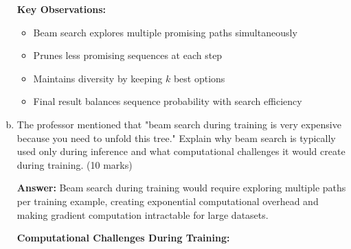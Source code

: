 \documentclass[12pt]{article}
\newcommand{\answer}[1]{{\color{answercolor}\textbf{Answer:} #1}}
\newcommand{\explanation}[1]{{\color{explanationcolor}#1}}
\begin{document}
\begin{enumerate}[(a)]
{\begin{center}
    \end{center}
    
    \textbf{Key Observations:}
    \begin{itemize}
        \item Beam search explores multiple promising paths simultaneously
        \item Prunes less promising sequences at each step
        \item Maintains diversity by keeping $k$ best options
        \item Final result balances sequence probability with search efficiency
    \end{itemize}
    }
    
    \item The professor mentioned that "beam search during training is very expensive because you need to unfold this tree." Explain why beam search is typically used only during inference and what computational challenges it would create during training. \hfill (10 marks)
    
    \answer{Beam search during training would require exploring multiple paths per training example, creating exponential computational overhead and making gradient computation intractable for large datasets.}
    
    \explanation{
    \textbf{Computational Challenges During Training:}
    
}
\end{enumerate}
\end{document}
